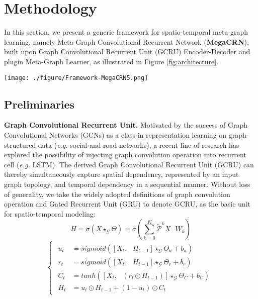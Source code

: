\documentclass[letterpaper]{article} \usepackage{aaai23}  \usepackage{times}  \usepackage{helvet}  \usepackage{courier}  \usepackage[hyphens]{url}  \usepackage{graphicx} \urlstyle{rm} \def\UrlFont{\rm}  \usepackage{natbib}  \usepackage{caption} \usepackage{multirow}
\begin{document}
\section{Methodology}
In this section, we present a generic framework for spatio-temporal meta-graph learning, namely Meta-Graph Convolutional Recurrent Network (\textbf{MegaCRN}), built upon Graph Convolutional Recurrent Unit (GCRU) Encoder-Decoder and plugin Meta-Graph Learner, as illustrated in Figure \ref{fig:architecture}.
\begin{figure*}[h]
	\centering
	\texttt{[image: ./figure/Framework-MegaCRN5.png]}
	\caption{Framework of \textbf{\underline{Me}}ta-\textbf{\underline{G}}r\textbf{\underline{a}}ph \underline{\textbf{C}}onvolutional \textbf{\underline{R}}ecurrent \textbf{\underline{N}}etwork (\textbf{MegaCRN})}
	\label{fig:architecture}
\end{figure*}

\subsection{Preliminaries}
\noindent\textbf{Graph Convolutional Recurrent Unit.} Motivated by the success of Graph Convolutional Networks (GCNs) as a class in representation learning on graph-structured data (\textit{e.g.} social and road networks), a recent line of research \cite{li2018diffusion, bai2020adaptive, shang2021discrete, ye2021coupled} has explored the possibility of injecting graph convolution operation into recurrent cell (\textit{e.g.} LSTM). The derived Graph Convolutional Recurrent Unit (GCRU) can thereby simultaneously capture spatial dependency, represented by an input graph topology, and temporal dependency in a sequential manner. Without loss of generality, we take the widely adopted definitions of graph convolution operation and Gated Recurrent Unit (GRU) to denote GCRU, as the basic unit for spatio-temporal modeling:
\begin{equation} \label{eq:gcn}
	H = \sigma (X \star_\mathcal{G} \Theta) = \sigma (\mathop{\sum}_{k=0}^K \mathcal{\tilde P}^k X \textit{ } W_k)
\end{equation}
\begin{equation} \label{eq:gcru}
	\begin{cases}
	\begin{aligned}
		u_t & = sigmoid([X_t, \textit{ } H_{t-1}] \star_\mathcal{G} \Theta_{u} + b_{u})      \\
		r_t & = sigmoid([X_t, \textit{ } H_{t-1}] \star_\mathcal{G} \Theta_{r} + b_{r})      \\
		C_t & = tanh([X_t, \textit{ } (r_t \odot H_{t-1})] \star_\mathcal{G} \Theta_{C} + b_{C})      \\
		H_t & = u_t \odot H_{t-1} + (1 - u_t) \odot C_t
	\end{aligned}
	\end{cases}
\end{equation}
\end{document}
